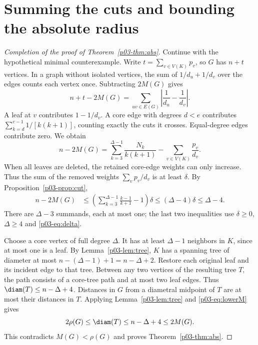 \documentclass[11pt,a4paper]{article}
\begin{document}
\section{Summing the cuts and bounding the absolute radius}\label{p03-sec:sum}
\begin{proof}[Completion of the proof of Theorem~\ref{p03-thm:abs}]
Continue with the hypothetical minimal counterexample. Write
$t=\sum_{v\in V(K)}p_v$, so $G$ has $n+t$ vertices. In a graph
without isolated vertices, the sum of $1/d_u+1/d_v$ over the edges
counts each vertex once. Subtracting $2M(G)$ gives
\[
 n+t-2M(G)=\sum_{uv\in E(G)}\left|\frac1{d_u}-\frac1{d_v}\right|.
\]
A leaf at $v$ contributes $1-1/d_v$. A core edge with degrees
$d<e$ contributes $\sum_{k=d}^{e-1}1/[k(k+1)]$, counting exactly
the cuts it crosses. Equal-degree edges contribute zero. We obtain
\begin{equation}\label{p03-eq:sum}
 n-2M(G)=\sum_{k=3}^{\Delta-1}\frac{N_k}{k(k+1)}
                     -\sum_{v\in V(K)}\frac{p_v}{d_v}.
\end{equation}
When all leaves are deleted, the retained core-edge weights can only
increase. Thus the sum of the removed weights $\sum_v p_v/d_v$ is at
least $\delta$. By Proposition~\ref{p03-prop:cut},
\begin{align}
 n-2M(G)
 &\le \left(\sum_{k=3}^{\Delta-1}\frac{k-1}{k+1}-1\right)\delta
 \le(\Delta-4)\delta
 \le\Delta-4 . \label{p03-eq:lowerM}
\end{align}
There are $\Delta-3$ summands, each at most one; the last two
inequalities use $\delta\ge0$, $\Delta\ge4$ and \eqref{p03-eq:delta}.

Choose a core vertex of full degree $\Delta$. It has at least
$\Delta-1$ neighbors in $K$, since at most one is a leaf. By
Lemma~\ref{p03-lem:tree}, $K$ has a spanning tree of diameter at most
$n-(\Delta-1)+1=n-\Delta+2$. Restore each original leaf and its
incident edge to that tree. Between any two vertices of the resulting
tree $T$, the path consists of a core-tree path and at most two leaf
edges. Thus $\diam(T)\le n-\Delta+4$. Distances in $G$ from a
diametral midpoint of $T$ are at most their distances in $T$. Applying
Lemma~\ref{p03-lem:tree} and \eqref{p03-eq:lowerM} gives
\begin{equation}\label{p03-eq:contradiction}
 2\rho(G)\le\diam(T)\le n-\Delta+4\le 2M(G).
\end{equation}
This contradicts $M(G)<\rho(G)$ and proves Theorem~\ref{p03-thm:abs}.
\end{proof}
\end{document}
